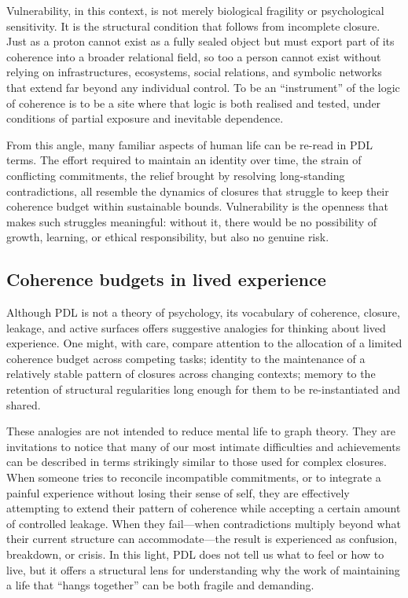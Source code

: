 \documentclass[11pt,a4paper]{article}
\theoremstyle{definition}
\begin{document}
Vulnerability, in this context, is not merely biological fragility or psychological sensitivity. It is the structural condition that follows from incomplete closure. Just as a proton cannot exist as a fully sealed object but must export part of its coherence into a broader relational field, so too a person cannot exist without relying on infrastructures, ecosystems, social relations, and symbolic networks that extend far beyond any individual control.\cite{Laubscher_UniversalCoherenceLeakage_2024,Laubscher_PDL_TO_Dialogue_2024} To be an ``instrument'' of the logic of coherence is to be a site where that logic is both realised and tested, under conditions of partial exposure and inevitable dependence.

From this angle, many familiar aspects of human life can be re-read in PDL terms. The effort required to maintain an identity over time, the strain of conflicting commitments, the relief brought by resolving long-standing contradictions, all resemble the dynamics of closures that struggle to keep their coherence budget within sustainable bounds.\cite{Laubscher_Existence_PulsatingClosure_2026} Vulnerability is the openness that makes such struggles meaningful: without it, there would be no possibility of growth, learning, or ethical responsibility, but also no genuine risk.

\subsection{Coherence budgets in lived experience}

Although PDL is not a theory of psychology, its vocabulary of coherence, closure, leakage, and active surfaces offers suggestive analogies for thinking about lived experience.\cite{Laubscher_Existence_PulsatingClosure_2026} One might, with care, compare attention to the allocation of a limited coherence budget across competing tasks; identity to the maintenance of a relatively stable pattern of closures across changing contexts; memory to the retention of structural regularities long enough for them to be re-instantiated and shared.

These analogies are not intended to reduce mental life to graph theory. They are invitations to notice that many of our most intimate difficulties and achievements can be described in terms strikingly similar to those used for complex closures. When someone tries to reconcile incompatible commitments, or to integrate a painful experience without losing their sense of self, they are effectively attempting to extend their pattern of coherence while accepting a certain amount of controlled leakage. When they fail—when contradictions multiply beyond what their current structure can accommodate—the result is experienced as confusion, breakdown, or crisis. In this light, PDL does not tell us what to feel or how to live, but it offers a structural lens for understanding why the work of maintaining a life that “hangs together” can be both fragile and demanding.
\end{document}
